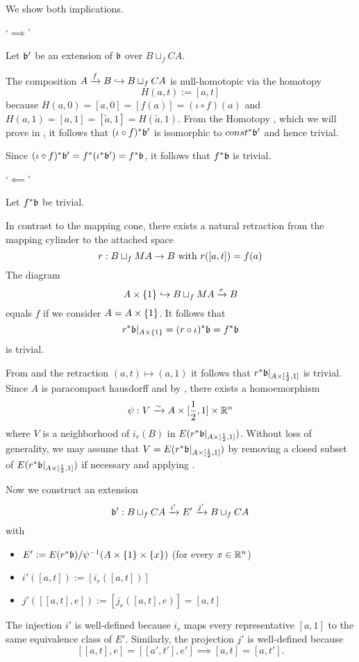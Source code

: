 \begin{myproof}
    We show both implications.

    `$\implies$'

    Let $\bb'$ be an extension of $\bb$ over $B \sqcup_f CA$.

    The composition $A \xto{f} B \incl B \sqcup_f CA$ is
    null-homotopic via the homotopy
    \[ H(a, t) := [a, t] \]
    because $H(a, 0) = [a, 0] = [f(a)] = (\iota \circ f)(a)$
     and $H(a, 1) = [a, 1] = [\tilde{a}, 1] = H(\tilde{a}, 1)$.
    From the Homotopy ,
    which we will prove in ,
    it follows that $\ind{(\iota \circ f)}\bb'$ is
    isomorphic to $\ind{const}\bb'$ and hence trivial.

    Since $\ind{(\iota \circ f)}\bb' = \ind{f}(\ind{\iota}\bb') = \ind{f}\bb$,
    it follows that $\ind{f}\bb$ is trivial.

    `$\impliedby$'

    Let $\ind{f}\bb$ be trivial.

    In contrast to the mapping cone,
    there exists a natural retraction from the mapping cylinder to the attached space
    \[ r: B \sqcup_f MA \to B \twith r([a, t]) = f(a) \]
    The diagram
    \[ A \times \{1\} \incl B \sqcup_f MA \xto{r} B \]
    equals $f$ if we consider $A = \cylup{A}$.
    It follows that
    \[ \ind{r}\bb\restr{A \times \{1\}} = \ind{(r \circ \iota)}\bb = \ind{f}\bb \]
    is trivial.

    From  and the retraction $(a, t) \mapsto (a, 1)$
    it follows that $\ind{r}\bb\restr{A \times [\half, 1]}$ is trivial.
    Since $A$ is paracompact hausdorff and by ,
    there exists a homoemorphism
    \[ \psi: V \isomto A \times [\half, 1] \times \R^n \]
    where $V$ is a neighborhood of $i_r(B)$ in $E(\ind{r}\bb\restr{A \times [\half, 1]})$.
    Without loss of generality,
    we may assume that $V = E(\ind{r}\bb\restr{A \times [\half, 1]})$
    by removing a closed subset of $E(\ind{r}\bb\restr{A \times [\half, 1]})$
    if necessary and applying .

    Now we construct an extension
    \[ \bundledef{\bb'}{B \sqcup_f CA}{E'}{i'}{j'} \]
    with
    \begin{itemize}
        \item $E' := E(\ind{r}\bb) / \inv{\psi}(A \times \{1\} \times \{x\})$ (for every $x \in \R^n$)
        \item $i'([a, t]) := [i_r([a, t])]$
        \item $j'([[a, t], e]) := [j_r([a, t], e)] = [a, t]$
    \end{itemize}
    The injection $i'$ is well-defined because $i_r$ maps every
    representative $[a, 1]$ to the same equivalence class of $E'$.
    Similarly, the projection $j'$ is well-defined because
    \[ [[a, t], e] = [[a', t'], e'] \implies  [a, t] = [a, t']. \]


\end{myproof}
